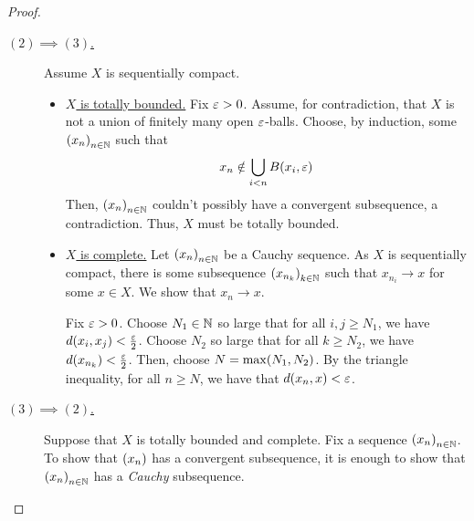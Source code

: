 \begin{proof}
\begin{description}
        \item[\underline{$(2) \implies (3)$.}] Assume $X$ is sequentially compact.
        \begin{itemize}
            \item \underline{$X$ is totally bounded.} Fix $\varepsilon > 0$. Assume, for contradiction, that $X$ is not a union of finitely many open $\varepsilon$-balls. Choose, by induction, some $\left( x_n \right)_{n \in \mathbb{N}}$ such that
            \begin{align*}
                x_n \notin \bigcup_{i < n} B\!\left( x_i, \varepsilon \right)
            \end{align*}
            Then, $\left( x_n \right)_{n \in \mathbb{N}}$ couldn't possibly have a convergent subsequence, a contradiction. Thus, $X$ must be totally bounded.

            \item \underline{$X$ is complete.} Let $\left( x_n \right)_{n \in \mathbb{N}}$ be a Cauchy sequence. As $X$ is sequentially compact, there is some subsequence $\left( x_{n_k} \right)_{k \in \mathbb{N}}$ such that $x_{n_i} \to x$ for some $x \in X$. We show that $x_n \to x$.

            Fix $\varepsilon > 0$. Choose $N_1 \in \mathbb{N}$ so large that for all $i, j \geq N_1$, we have $d\!\left( x_i, x_j \right) < \frac{\varepsilon}{2}$. Choose $N_2$ so large that for all $k \geq N_2$, we have $d\!\left( x_{n_k} \right) < \frac{\varepsilon}{2}$. Then, choose $N = \max\!\left( N_1, N_2 \right)$. By the triangle inequality, for all $n \geq N$, we have that $d\!\left( x_n, x \right) < \varepsilon$.
        \end{itemize}

        \item[\underline{$(3) \implies (2)$.}] Suppose that $X$ is totally bounded and complete. Fix a sequence $\left( x_n \right)_{n \in \mathbb{N}}$. To show that $\left( x_n \right)$ has a convergent subsequence, it is enough to show that $\left( x_n \right)_{n \in \mathbb{N}}$ has a \textit{Cauchy} subsequence.


\end{description}
\end{proof}
